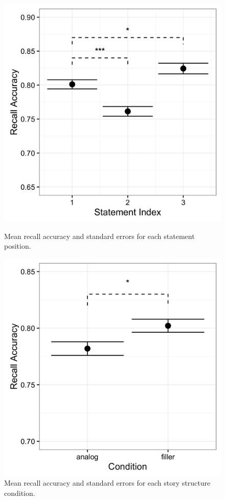 \documentclass[a4paper,man,natbib,floatsintext,import]{apa6}
\begin{document}
\begin{figure}
\begin{minipage}[t]{.5\textwidth}
\includegraphics[width=.9\linewidth]{figures/conf_statIdx.png}
\caption{Mean recall accuracy and standard errors for each statement position.}
\label{fig:conf_statIdx}
\end{minipage}
\begin{minipage}[t]{.5\textwidth}
\includegraphics[width=.9\linewidth]{figures/conf_condition.png}
\caption{Mean recall accuracy and standard errors for each story structure condition.}
\label{fig:conf_condition}
\end{minipage}
\end{figure}
\end{document}
